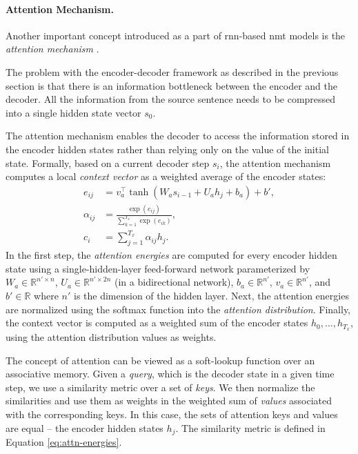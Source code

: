 \paragraph{Attention Mechanism.} Another important concept introduced as a part
of \ac{rnn}-based \ac{nmt} models is the \emph{attention mechanism}
\citep{bahdanau2014neural,luong-etal-2015-effective}.

The problem with the encoder-decoder framework as described in the previous
section is that there is an information bottleneck between the encoder and the
decoder. All the information from the source sentence needs to be compressed
into a single hidden state vector $s_0$.

The attention mechanism enables the decoder to access the information stored in
the encoder hidden states rather than relying only on the value of the initial
state.  Formally, based on a current decoder step $s_i$, the attention mechanism
computes a local \emph{context vector} as a weighted average of the encoder
states:
%
\begin{align}
  e_{ij} &= v_a^\top \tanh (W_a s_{i-1} + U_a h_j + b_a) + b', \label{eq:attn-energies} \\
  \alpha_{ij} &= \frac{\exp(e_{ij})}{\sum_{k=1}^{T_x}\exp(e_{ik})}, \\
  c_i &= \sum_{j=1}^{T_x} \alpha_{ij} h_j.
\end{align}
%
In the first step, the \emph{attention energies} are computed for every encoder
hidden state using a single-hidden-layer feed-forward network parameterized by
$W_a \in \mathbb{R}^{n' \times n}$, $U_a \in \mathbb{R}^{n' \times 2n}$ (in a
bidirectional network), $b_a \in \mathbb{R}^{n'}$, $v_a \in \mathbb{R}^{n'}$,
and $b' \in \mathbb{R}$ where $n'$ is the dimension of the hidden layer. Next,
the attention energies are normalized using the softmax function into the
\emph{attention distribution}.  Finally, the context vector is computed as a
weighted sum of the encoder states $h_0,\ldots, h_{T_x}$, using the attention
distribution values as weights.

The concept of attention can be viewed as a soft-lookup function over an
associative memory. Given a \emph{query}, which is the decoder state in a given
time step, we use a similarity metric over a set of \emph{keys}. We then
normalize the similarities and use them as weights in the weighted sum of
\emph{values} associated with the corresponding keys. In this case, the sets of
attention keys and values are equal -- the encoder hidden states $h_j$. The
similarity metric is defined in Equation \ref{eq:attn-energies}.

